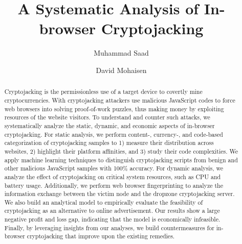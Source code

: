 \documentclass[acmlarge]{acmart}
\begin{document}
\title{A Systematic Analysis of In-browser Cryptojacking}

\author{Muhammad Saad}
\author{David Mohaisen}





\begin{abstract}
Cryptojacking is the permissionless use of a target device to covertly mine cryptocurrencies. With cryptojacking attackers use malicious JavaScript codes to force web browsers into solving proof-of-work puzzles, thus making money by exploiting resources of the website visitors. To understand and counter such attacks, we systematically analyze the static, dynamic, and economic aspects of in-browser cryptojacking. For static analysis, we perform content-, currency-, and code-based categorization of cryptojacking samples to 1) measure their distribution across websites, 2) highlight their platform affinities, and 3) study their code complexities. We apply machine learning techniques to distinguish cryptojacking scripts from benign and other malicious JavaScript samples with 100\% accuracy. For dynamic analysis, we analyze the effect of cryptojacking on critical system resources, such as CPU and battery usage. Additionally, we perform web browser fingerprinting to analyze the information exchange between the victim node and the dropzone cryptojacking server. We also build an analytical model to empirically evaluate the feasibility of cryptojacking as an alternative to online advertisement. Our results show a large negative profit and loss gap, indicating that the model is economically infeasible. Finally, by leveraging insights from our analyses, we build countermeasures for in-browser cryptojacking that improve upon the existing remedies.  

\end{abstract}
\end{document}
